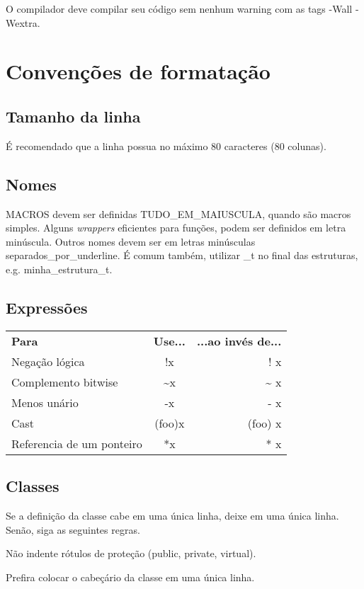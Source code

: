 \documentclass{article}
\begin{document}
O compilador deve compilar seu código sem nenhum warning com as tags -Wall -Wextra.


\section{Convenções de formatação}
\subsection{Tamanho da linha}
É recomendado que a linha possua no máximo 80 caracteres (80 colunas).

\subsection{Nomes}
MACROS devem ser definidas TUDO\_EM\_MAIUSCULA, quando são macros simples. Alguns \emph{wrappers} eficientes para funções, podem ser definidos em letra minúscula. Outros nomes devem ser em letras minúsculas separados\_por\_underline. É comum também, utilizar \_t no final das estruturas, e.g. minha\_estrutura\_t.

\subsection{Expressões}
\begin{tabular}{ l c r }
	{\bf Para} 			& {\bf Use...} 		& {\bf ...ao invés de...} \\
	Negação lógica 			& !x 			& ! x \\
	Complemento bitwise 		& \textasciitilde x 	& \textasciitilde{}  x \\
	Menos unário			& -x			& - x \\
	Cast				& (foo)x		& (foo) x \\
	Referencia de um ponteiro	& *x			& * x \\
\end{tabular}


\subsection{Classes}

Se a definição da classe cabe em uma única linha, deixe em uma única linha. Senão, siga as seguintes regras.

Não indente rótulos de proteção (public, private, virtual).

Prefira colocar o cabeçário da classe em uma única linha.
\end{document}
